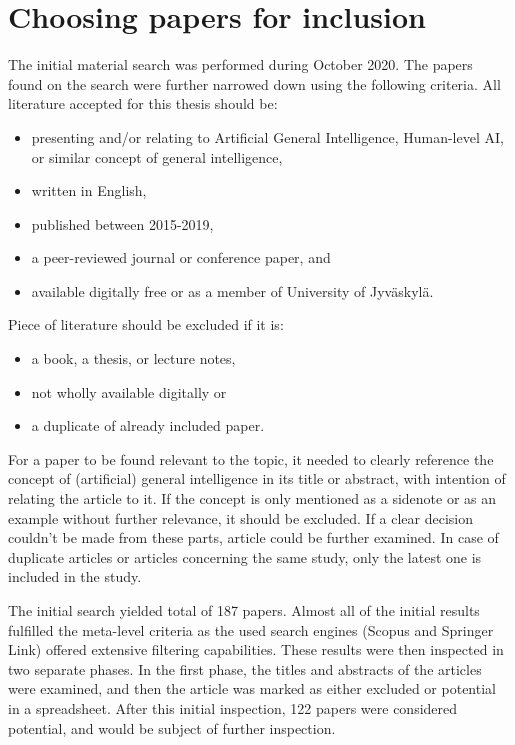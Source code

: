 \documentclass[utf8,english]{gradu3}
\begin{document}
\section{Choosing papers for inclusion}

The initial material search was performed during October 2020. The papers found
on the search were further narrowed down using the following criteria. All
literature accepted for this thesis should be:

\begin{itemize}
  \item presenting and/or relating to Artificial General Intelligence,
        Human-level AI, or similar concept of general intelligence,
  \item written in English,
  \item published between 2015-2019,
  \item a peer-reviewed journal or conference paper, and
  \item available digitally free or as a member of University of Jyväskylä.
\end{itemize}

Piece of literature should be excluded if it is:

\begin{itemize}
  \item a book, a thesis, or lecture notes,
  \item not wholly available digitally or
  \item a duplicate of already included paper.
\end{itemize}

For a paper to be found relevant to the topic, it needed to clearly reference
the concept of (artificial) general intelligence in its title or abstract, with
intention of relating the article to it. If the concept is only mentioned as a
sidenote or as an example without further relevance, it should be excluded. If a
clear decision couldn't be made from these parts, article could be further
examined. In case of duplicate articles or articles concerning the same study,
only the latest one is included in the study.

The initial search yielded total of 187 papers. Almost all of the initial
results fulfilled the meta-level criteria as the used search engines (Scopus and
Springer Link) offered extensive filtering capabilities. These results were then
inspected in two separate phases. In the first phase, the titles and abstracts
of the articles were examined, and then the article was marked as either
excluded or potential in a spreadsheet. After this initial inspection, 122
papers were considered potential, and would be subject of further inspection.
\end{document}
